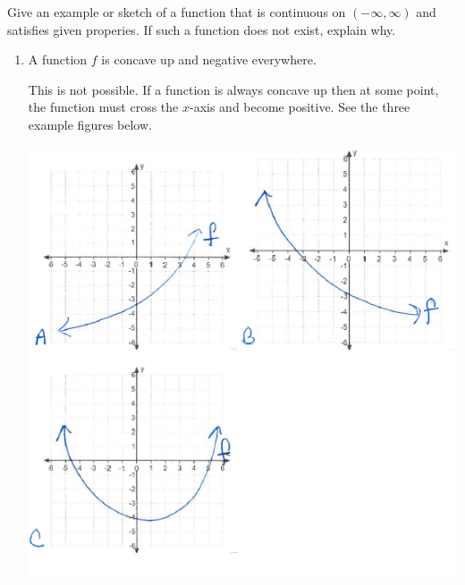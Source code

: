 \documentclass[nooutcomes]{ximera}
\begin{document}
\begin{problem}
Give an example or sketch of a function that is continuous on $(-\infty,\infty)$ and satisfies given properies.  If such a function does not exist, explain why.
\begin{enumerate}
	\item A function $f$ is concave up and negative everywhere.
	\begin{freeResponse}
	This is not possible.  If a function is always concave up then at some point, the function must cross the $x$-axis and become positive.  See the three example figures below.
	      \begin{image}
        \includegraphics[scale = 0.5]{figure8.png}
      \end{image}	
			

\end{freeResponse}
\end{enumerate}
\end{problem}
\end{document}
